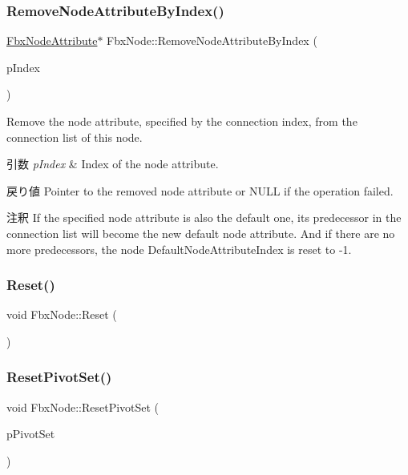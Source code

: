 \subsubsection{\texorpdfstring{Remove\+Node\+Attribute\+By\+Index()}{RemoveNodeAttributeByIndex()}}
{\footnotesize\ttfamily \hyperlink{class_fbx_node_attribute}{Fbx\+Node\+Attribute}$\ast$ Fbx\+Node\+::\+Remove\+Node\+Attribute\+By\+Index (\begin{DoxyParamCaption}\item[{int}]{p\+Index }\end{DoxyParamCaption})}

Remove the node attribute, specified by the connection index, from the connection list of this node. 
\begin{DoxyParams}{引数}
{\em p\+Index} & Index of the node attribute. \\
\hline
\end{DoxyParams}
\begin{DoxyReturn}{戻り値}
Pointer to the removed node attribute or {\ttfamily N\+U\+LL} if the operation failed. 
\end{DoxyReturn}
\begin{DoxyRemark}{注釈}
If the specified node attribute is also the default one, its predecessor in the connection list will become the new default node attribute. And if there are no more predecessors, the node Default\+Node\+Attribute\+Index is reset to -\/1. 
\end{DoxyRemark}
\mbox{\label{class_fbx_node_a13f7363abfcbf8d62952464ea3723898}} 
\subsubsection{\texorpdfstring{Reset()}{Reset()}}
{\footnotesize\ttfamily void Fbx\+Node\+::\+Reset (\begin{DoxyParamCaption}{ }\end{DoxyParamCaption})\hspace{0.3cm}{\ttfamily [protected]}}

\mbox{\label{class_fbx_node_a19800e7793c5c297efc143f50554b739}} 
\subsubsection{\texorpdfstring{Reset\+Pivot\+Set()}{ResetPivotSet()}}
{\footnotesize\ttfamily void Fbx\+Node\+::\+Reset\+Pivot\+Set (\begin{DoxyParamCaption}\item[{\hyperlink{class_fbx_node_ae62b7311ac4727654cdf1ebd5cbf7343}{Fbx\+Node\+::\+E\+Pivot\+Set}}]{p\+Pivot\+Set }\end{DoxyParamCaption})}


